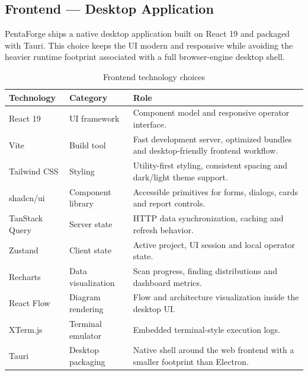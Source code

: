 \documentclass[12pt,a4paper]{report}
\begin{document}
\subsection{Frontend --- Desktop Application}

PentaForge ships a native desktop application built on React 19 and packaged with
Tauri. This choice keeps the UI modern and responsive while avoiding the heavier
runtime footprint associated with a full browser-engine desktop shell.

\begin{table}[H]
    \centering
    \caption{Frontend technology choices}
    \label{tab:frontend_stack}
    \renewcommand{\arraystretch}{1.35}
    \begin{tabular}{|p{}|p{}|p{}|}
        \hline
        \textbf{Technology} & \textbf{Category} & \textbf{Role} \\
        \hline
        React 19 & UI framework & Component model and responsive operator interface. \\
        \hline
        Vite & Build tool & Fast development server, optimized bundles and desktop-friendly frontend workflow. \\
        \hline
        Tailwind CSS & Styling & Utility-first styling, consistent spacing and dark/light theme support. \\
        \hline
        shadcn/ui & Component library & Accessible primitives for forms, dialogs, cards and report controls. \\
        \hline
        TanStack Query & Server state & HTTP data synchronization, caching and refresh behavior. \\
        \hline
        Zustand & Client state & Active project, UI session and local operator state. \\
        \hline
        Recharts & Data visualization & Scan progress, finding distributions and dashboard metrics. \\
        \hline
        React Flow & Diagram rendering & Flow and architecture visualization inside the desktop UI. \\
        \hline
        XTerm.js & Terminal emulator & Embedded terminal-style execution logs. \\
        \hline
        Tauri & Desktop packaging & Native shell around the web frontend with a smaller footprint than Electron. \\
        \hline
    \end{tabular}
\end{table}
\end{document}

